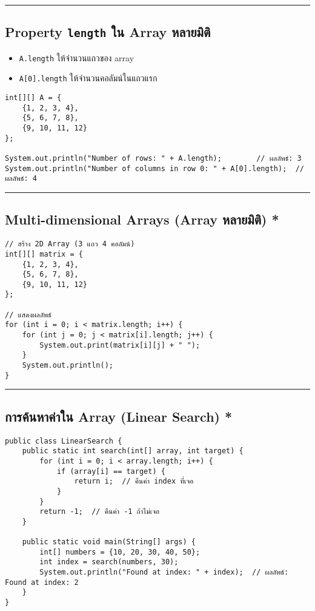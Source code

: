 \documentclass[11pt]{article}
\begin{document}
\noindent\rule{\textwidth}{0.5pt}
\subsection{Property \texttt{length} ใน Array หลายมิติ}
\label{sec:org915290c}
\begin{itemize}
\item \texttt{A.length} ให้จำนวนแถวของ array
\item \texttt{A[0].length} ให้จำนวนคอลัมน์ในแถวแรก
\end{itemize}

\begin{verbatim}
int[][] A = {
    {1, 2, 3, 4},
    {5, 6, 7, 8},
    {9, 10, 11, 12}
};

System.out.println("Number of rows: " + A.length);        // ผลลัพธ์: 3
System.out.println("Number of columns in row 0: " + A[0].length);  // ผลลัพธ์: 4
\end{verbatim}

\noindent\rule{\textwidth}{0.5pt}
\subsection{Multi-dimensional Arrays (Array หลายมิติ) *}
\label{sec:orge80bad3}
\begin{verbatim}
// สร้าง 2D Array (3 แถว 4 คอลัมน์)
int[][] matrix = {
    {1, 2, 3, 4},
    {5, 6, 7, 8},
    {9, 10, 11, 12}
};

// แสดงผลลัพธ์
for (int i = 0; i < matrix.length; i++) {
    for (int j = 0; j < matrix[i].length; j++) {
        System.out.print(matrix[i][j] + " ");
    }
    System.out.println();
}
\end{verbatim}

\noindent\rule{\textwidth}{0.5pt}
\subsection{การค้นหาค่าใน Array (Linear Search) *}
\label{sec:org74b0cb3}
\begin{verbatim}
public class LinearSearch {
    public static int search(int[] array, int target) {
        for (int i = 0; i < array.length; i++) {
            if (array[i] == target) {
                return i;  // คืนค่า index ที่เจอ
            }
        }
        return -1;  // คืนค่า -1 ถ้าไม่เจอ
    }

    public static void main(String[] args) {
        int[] numbers = {10, 20, 30, 40, 50};
        int index = search(numbers, 30);
        System.out.println("Found at index: " + index);  // ผลลัพธ์: Found at index: 2
    }
}
\end{verbatim}
\end{document}
